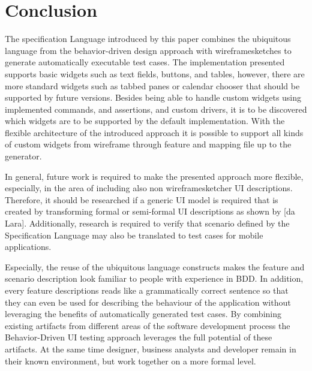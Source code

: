 \documentclass{sig-alternate-05-2015}
\begin{document}
\section{Conclusion}\label{sec:Conclusion} %
The specification Language introduced by this paper combines the ubiquitous language from the behavior-driven design approach with wireframesketches to generate automatically executable test cases.
The implementation presented supports basic widgets such as text fields, buttons, and tables, however, there are more standard widgets such as tabbed panes or calendar chooser that should be supported by future versions.
Besides being able to handle custom widgets using implemented commands, and assertions, and custom drivers, it is to be discovered which widgets are to be supported by the default implementation.
With the flexible architecture of the introduced approach it is possible to support all kinds of custom widgets from wireframe through feature and mapping file up to the generator.

In general, future work is required to make the presented approach more flexible, especially, in the area of including also non wireframesketcher UI descriptions. 
Therefore, it should be researched if a generic UI model is required that is created by transforming formal or semi-formal UI descriptions as shown by [da Lara].
Additionally, research is required to verify that scenario defined by the Specification Language may also be translated to test cases for mobile applications.  

Especially, the reuse of the ubiquitous language constructs makes the feature and scenario description look familiar to people with experience in BDD. 
In addition, every feature descriptions reads like a grammatically correct sentence so that they can even be used for describing the behaviour of the application without leveraging the benefits of automatically generated test cases.
By combining existing artifacts from different areas of the software development process the Behavior-Driven UI testing approach leverages the full potential of these artifacts.
At the same time designer, business analysts and developer remain in their known environment, but work together on a more formal level. 

\end{document}
